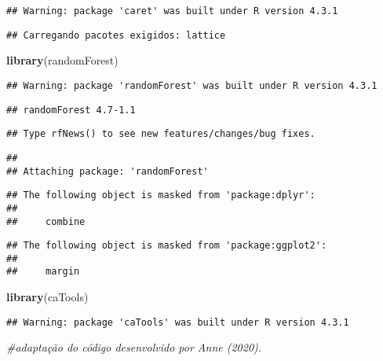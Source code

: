 \documentclass[
]{article}
\newenvironment{Shaded}{\begin{snugshade}}{\end{snugshade}}
\newcommand{\CommentTok}[1]{\textcolor[rgb]{0.56,0.35,0.01}{\textit{#1}}}
\newcommand{\FunctionTok}[1]{\textcolor[rgb]{0.13,0.29,0.53}{\textbf{#1}}}
\newcommand{\NormalTok}[1]{#1}
\begin{document}
\begin{verbatim}
## Warning: package 'caret' was built under R version 4.3.1
\end{verbatim}

\begin{verbatim}
## Carregando pacotes exigidos: lattice
\end{verbatim}

\begin{Shaded}
\begin{Highlighting}[]
\FunctionTok{library}\NormalTok{(randomForest)}
\end{Highlighting}
\end{Shaded}

\begin{verbatim}
## Warning: package 'randomForest' was built under R version 4.3.1
\end{verbatim}

\begin{verbatim}
## randomForest 4.7-1.1
\end{verbatim}

\begin{verbatim}
## Type rfNews() to see new features/changes/bug fixes.
\end{verbatim}

\begin{verbatim}
## 
## Attaching package: 'randomForest'
\end{verbatim}

\begin{verbatim}
## The following object is masked from 'package:dplyr':
## 
##     combine
\end{verbatim}

\begin{verbatim}
## The following object is masked from 'package:ggplot2':
## 
##     margin
\end{verbatim}

\begin{Shaded}
\begin{Highlighting}[]
\FunctionTok{library}\NormalTok{(caTools)}
\end{Highlighting}
\end{Shaded}

\begin{verbatim}
## Warning: package 'caTools' was built under R version 4.3.1
\end{verbatim}

\begin{Shaded}
\begin{Highlighting}[]
\CommentTok{\#adaptação do código desenvolvido por Anne (2020).}
\end{Highlighting}
\end{Shaded}
\end{document}
